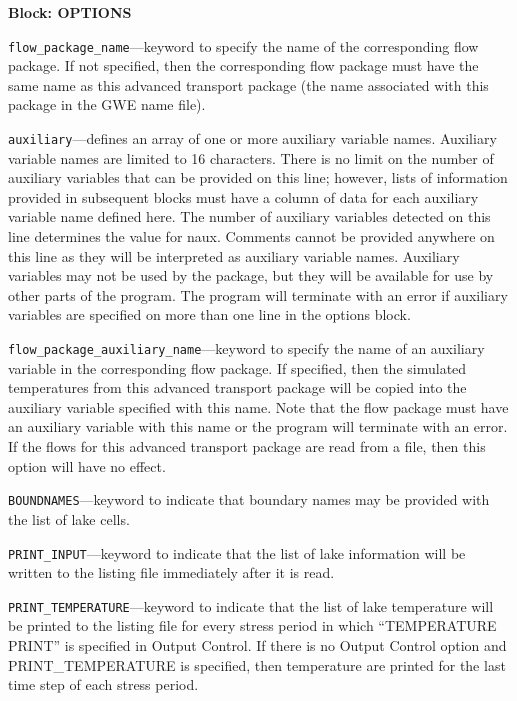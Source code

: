 
\item \textbf{Block: OPTIONS}

\begin{description}
\item \texttt{flow\_package\_name}---keyword to specify the name of the corresponding flow package.  If not specified, then the corresponding flow package must have the same name as this advanced transport package (the name associated with this package in the GWE name file).

\item \texttt{auxiliary}---defines an array of one or more auxiliary variable names.  Auxiliary variable names are limited to 16 characters.  There is no limit on the number of auxiliary variables that can be provided on this line; however, lists of information provided in subsequent blocks must have a column of data for each auxiliary variable name defined here.  The number of auxiliary variables detected on this line determines the value for naux.  Comments cannot be provided anywhere on this line as they will be interpreted as auxiliary variable names.  Auxiliary variables may not be used by the package, but they will be available for use by other parts of the program.  The program will terminate with an error if auxiliary variables are specified on more than one line in the options block.

\item \texttt{flow\_package\_auxiliary\_name}---keyword to specify the name of an auxiliary variable in the corresponding flow package.  If specified, then the simulated temperatures from this advanced transport package will be copied into the auxiliary variable specified with this name.  Note that the flow package must have an auxiliary variable with this name or the program will terminate with an error.  If the flows for this advanced transport package are read from a file, then this option will have no effect.

\item \texttt{BOUNDNAMES}---keyword to indicate that boundary names may be provided with the list of lake cells.

\item \texttt{PRINT\_INPUT}---keyword to indicate that the list of lake information will be written to the listing file immediately after it is read.

\item \texttt{PRINT\_TEMPERATURE}---keyword to indicate that the list of lake temperature will be printed to the listing file for every stress period in which ``TEMPERATURE PRINT'' is specified in Output Control.  If there is no Output Control option and PRINT\_TEMPERATURE is specified, then temperature are printed for the last time step of each stress period.


\end{description}
